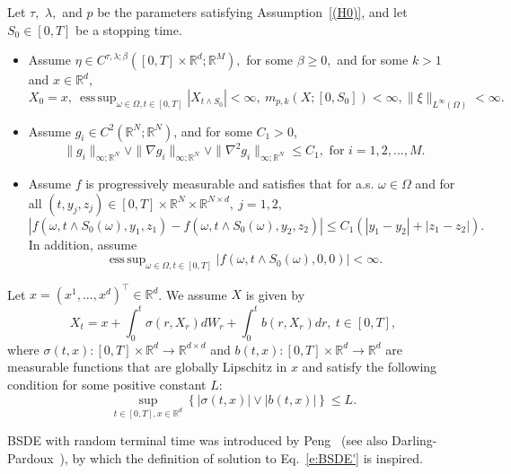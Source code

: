 \documentclass[11pt,reqno]{amsart}
\def\R{\mathbb R}
\newenvironment{assumptionp}[1]{
\renewcommand\theassumptionalt{#1}
\assumptionalt
}{\endassumptionalt}
\DeclareMathOperator*{\esssup}{ess\,sup}
\numberwithin{equation}{section}
\begin{document}
\begin{assumptionp}{(H2)}\label{(H2)}
Let $\tau,$ $\lambda,$ and $p$ be the parameters satisfying Assumption~\ref{(H0)}, and let $S_0\in[0,T]$ be a stopping time.
\begin{itemize}
\item[$(1)$] Assume $\eta\in C^{\tau,\lambda;\beta}([0,T]\times\mathbb{R}^{d};\mathbb{R}^{M}),$ for some $\beta \ge 0,$ and for some $k >1$ and $x\in\R^d$,
\[X_{0} = x,\ \esssup_{\omega\in\Omega, t\in[0,T]}|X_{t\land S_{0}}|<\infty,\  m_{p,k}(X;[0,S_{0}])<\infty,    \|\xi\|_{L^{\infty}(\Omega)}<\infty.\]


\item[$(2)$] Assume $g_{i}\in C^2(\mathbb{R}^{N};\mathbb{R}^{N})$, and for some $C_1>0$,
\[\|g_{i}\|_{\infty;\R^N}\vee\|\nabla g_{i}\|_{\infty;\mathbb{R}^{N}}\vee \|\nabla^{2} g_{i}\|_{\infty;\mathbb{R}^{N}} \le C_{1}, \text{ for } i=1,2,...,M.\]

\item[$(3)$] Assume $f$ is progressively measurable and satisfies that for a.s. $\omega\in\Omega$ and for all $(t,y_{j},z_{j})\in[0,T]\times\mathbb{R}^{N}\times\mathbb{R}^{N\times d},\ j=1,2,$
\begin{equation}\label{e:(3) in (H2)}
|f(\omega,t\land S_{0}(\omega),y_{1},z_{1}) - f(\omega, t\land S_{0}(\omega),y_{2},z_{2})|\le C_{1}\left(|y_{1} - y_{2}| + |z_{1} - z_{2}|\right).
\end{equation}
In addition, assume 
\[\esssup_{\omega\in\Omega, t\in[0,T]}|f(\omega,t\land S_{0}(\omega),0,0)|<\infty.\]
\end{itemize}
\end{assumptionp}


\begin{assumptionp}{(A)}\label{(A)}
Let $x = (x^{1},...,x^{d})^{\top}\in\R^d$. We assume  $X$ is given by 
\begin{equation}\label{e:X_t = x + ...}
X_{t} = x + \int_{0}^{t}\sigma(r,X_{r})dW_{r} + \int_{0}^{t} b(r,X_{r}) dr,\ t\in[0,T],
\end{equation}
where $\sigma(t,x):[0,T]\times\mathbb{R}^{d}\to\mathbb{R}^{d\times d}$ and $b(t,x):[0,T]\times\mathbb{R}^{d}\to\mathbb{R}^{d}$ are measurable functions that are globally Lipschitz in $x$ and satisfy the following condition for some positive constant $L$:
\[\sup_{t\in[0,T],x\in \mathbb{R}^{d}}\left\{|\sigma(t,x)| \vee |b(t,x)|\right\}\le L.\]
\end{assumptionp}


BSDE with random terminal time was introduced by Peng~\cite{Peng-1991} (see also Darling-Pardoux~\cite{DP97}), by which  the definition of solution to Eq.~\eqref{e:BSDE'} is inspired.
\end{document}
